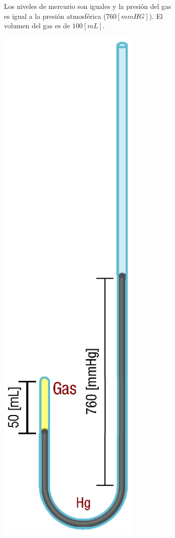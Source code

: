 \documentclass[letter,11pt]{article}
\begin{document}
\begin{figure}
\begin{subfigure}{.30\textwidth}
    \caption{Los niveles de mercurio son iguales y la presión del gas es igual a
    la presión atmosférica ($760 [mmHG]$). El volumen del gas es de $100 [mL]$.}
    \label{figura1a}
\end{subfigure}
\hfill
\begin{subfigure}{.30\textwidth}
    \centering
    \includegraphics[width=0.75\textwidth]{resources/f1b.eps}

\end{subfigure}
\end{figure}
\end{document}
